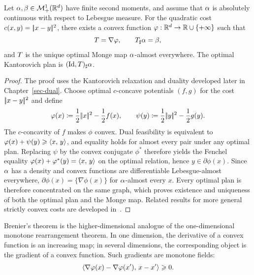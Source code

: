 \begin{thm}[Brenier]\label{thm-brenier}
	Let $\alpha,\beta\in\mathcal{M}_+^1(\mathbb{R}^d)$ have finite second moments, and assume that $\alpha$ is absolutely continuous with respect to Lebesgue measure. For the quadratic cost $c(x,y)=|\!| x-y |\!|^2$, there exists a convex function $\varphi:\mathbb{R}^d\to\mathbb{R}\cup\{+\infty\}$ such that
	\[
		T=\nabla\varphi,
		\qquad
		T_\sharp\alpha=\beta,
	\]
	and $T$ is the unique optimal Monge map $\alpha$-almost everywhere. The optimal Kantorovich plan is $(\mathrm{Id},T)_\sharp\alpha$.
\end{thm}
\begin{proof}
	The proof uses the Kantorovich relaxation and duality developed later in Chapter~\ref{sec-dual}. Choose optimal $c$-concave potentials $(f,g)$ for the cost $|\!| x-y |\!|^2$ and define
	\[
		\varphi(x)\coloneqq\frac12|\!| x |\!|^2-\frac12 f(x),
		\qquad
		\psi(y)\coloneqq\frac12|\!| y |\!|^2-\frac12 g(y).
	\]
	The $c$-concavity of $f$ makes $\phi$ convex. Dual feasibility is equivalent to $\varphi(x)+\psi(y)\geqslant\langle x,\,y\rangle$, and equality holds for almost every pair under any optimal plan. Replacing $\psi$ by the convex conjugate $\phi^*$ therefore yields the Fenchel equality $\varphi(x)+\varphi^*(y)=\langle x,\,y\rangle$ on the optimal relation, hence $y\in\partial\phi(x)$. Since $\alpha$ has a density and convex functions are differentiable Lebesgue-almost everywhere, $\partial\phi(x)=\{\nabla\phi(x)\}$ for $\alpha$-almost every $x$. Every optimal plan is therefore concentrated on the same graph, which proves existence and uniqueness of both the optimal plan and the Monge map. Related results for more general strictly convex costs are developed in~\cite{gangbo1996geometry,caffarelli2002constructing,Villani09}.
\end{proof}

Brenier's theorem is the higher-dimensional analogue of the one-dimensional monotone rearrangement theorem. In one dimension, the derivative of a convex function is an increasing map; in several dimensions, the corresponding object is the gradient of a convex function. Such gradients are monotone fields:
\[
	\langle \nabla\varphi(x)-\nabla\varphi(x'),\,x-x'\rangle\geqslant0.
\]

